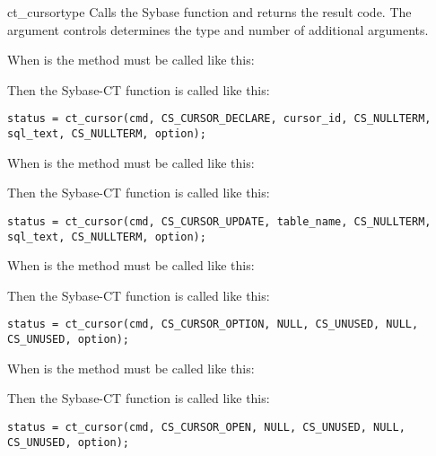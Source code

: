 \begin{methoddesc}[CS_COMMAND]{ct_cursor}{type \optional{, \ldots}}
Calls the Sybase  function and returns the
result code.  The  argument controls determines the type and
number of additional arguments.

When  is  the method must be called like
this:


Then the Sybase-CT  function is called like
this:

\begin{verbatim}
status = ct_cursor(cmd, CS_CURSOR_DECLARE, cursor_id, CS_NULLTERM, sql_text, CS_NULLTERM, option);
\end{verbatim}

When  is  the method must be called like
this:


Then the Sybase-CT  function is called like
this:

\begin{verbatim}
status = ct_cursor(cmd, CS_CURSOR_UPDATE, table_name, CS_NULLTERM, sql_text, CS_NULLTERM, option);
\end{verbatim}

When  is  the method must be called like
this:


Then the Sybase-CT  function is called like
this:

\begin{verbatim}
status = ct_cursor(cmd, CS_CURSOR_OPTION, NULL, CS_UNUSED, NULL, CS_UNUSED, option);
\end{verbatim}

When  is  the method must be called like
this:


Then the Sybase-CT  function is called like
this:

\begin{verbatim}
status = ct_cursor(cmd, CS_CURSOR_OPEN, NULL, CS_UNUSED, NULL, CS_UNUSED, option);
\end{verbatim}


\end{methoddesc}

